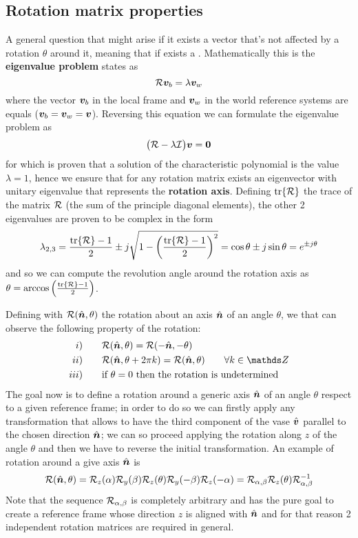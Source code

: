 	\subsection{Rotation matrix properties}
		A general question that might arise if it exists a vector that's not affected by a rotation $\theta$ around it, meaning that if exists a . Mathematically this is the \textbf{eigenvalue problem} states as
		\[ \mathcal R \boldsymbol{v}_b = \lambda \boldsymbol{v}_w \] 
		where the vector $\boldsymbol{v}_b$ in the local frame and $\boldsymbol{v}_w$ in the world reference systems are equals ($\boldsymbol{v}_b = \boldsymbol{v}_w = \boldsymbol{v}$). Reversing this equation we can formulate the eigenvalue problem as
		\[ \big(\mathcal R - \lambda\mathcal I\big) \boldsymbol{v} = \boldsymbol{0} \]
		for which is proven that a solution of the characteristic polynomial is the value $\lambda = 1$, hence we ensure that for any rotation matrix exists an eigenvector with unitary eigenvalue that represents the \textbf{rotation axis}. Defining  $\textrm{tr}\{\mathcal R\}$ the trace of the matrix $\mathcal R$ (the sum of the principle diagonal elements), the other 2 eigenvalues are proven to be complex in the form
		\[ \lambda_{2,3} = \frac{\textrm{tr}\{\mathcal R\} - 1 }2 \pm j \sqrt{1- \left( \frac{\textrm{tr}\{\mathcal R\} - 1}{2} \right)^2} = \cos\theta \pm j \sin\theta = e^{\pm j\theta} \]
		and so we can compute the revolution angle around the rotation axis as $\theta = \arccos \left( \frac{\textrm{tr}\{\mathcal R\} - 1}{2} \right)$.
		
		Defining with $\mathcal R(\hat{\boldsymbol{n}},\theta)$ the rotation about an axis $\hat{\boldsymbol{n}}$ of an angle $\theta$, we that can observe the following property of the rotation:
		\begin{align*}
			i)& \qquad \rot(\vers n,\theta) = \rot (-\vers n,-\theta) \\ 
			ii) & \qquad \rot(\vers n,\theta + 2\pi k) = \rot(\vers n,\theta) \qquad \forall k \in \mathds Z \\ 
			iii)& \qquad \textrm{if } \theta= 0 \textrm{ then the rotation is undetermined}
		\end{align*}
		The goal now is to define a rotation around a generic axis $\hat{\boldsymbol{n}}$ of an angle $\theta$ respect to a given reference frame; in order to do so we can firstly apply any transformation that allows to have the third component of the vase $\hat{\boldsymbol{v}}$ parallel to the chosen direction $\hat{\boldsymbol{n}}$; we can so proceed applying the rotation along $z$ of the angle $\theta$ and then we have to reverse the initial transformation. An example of rotation around a give axis $\hat{\boldsymbol{n}}$ is
		\[ \mathcal R(\hat{\boldsymbol{n}},\theta) = \mathcal R_z(\alpha) \mathcal R_y(\beta) \mathcal R_z(\theta) \mathcal R_y(-\beta)\mathcal R_z(-\alpha) = \mathcal R_{\alpha,\beta} \mathcal R_z(\theta) \mathcal R_{\alpha,\beta}^{-1} \]
		Note that the sequence $\mathcal R_{\alpha,\beta}$ is completely arbitrary and has the pure goal to create a reference frame whose direction $z$ is aligned with $\hat{\boldsymbol{n}}$ and for that reason 2 independent rotation matrices are required in general.
		
